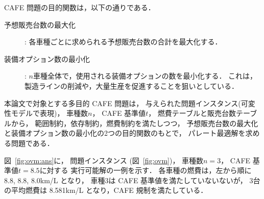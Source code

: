 CAFE 問題の目的関数は，以下の通りである．
\begin{description}
 \item[予想販売台数の最大化]: 各車種ごとに求められる予想販売台数の合計を最大化する．
 \item[装備オプション数の最小化]: $n$車種全体で，使用される装備オプションの数を最小化する．
   これは，製造ラインの削減や，大量生産を促進することを狙いとしている．
\end{description}

本論文で対象とする多目的 CAFE 問題は，
与えられた問題インスタンス(可変性モデルで表現)，
車種数$n$，
CAFE 基準値$t$，
燃費テーブルと販売台数テーブルから，
範囲制約，依存制約，燃費制約を満たしつつ，
予想販売台数の最大化と装備オプション数の最小化の2つの目的関数のもとで，
パレート最適解を求める問題である．

図~\ref{fig:ovm:ans}に，
問題インスタンス (図~\ref{fig:ovm})，
車種数$n=3$，
CAFE 基準値$t=8.5$に対する
実行可能解の一例を示す．
各車種の燃費は，左から順に 8.8, 8.8, 8.0km/L となり，
車種3は CAFE 基準値を満たしていないないが，
3台の平均燃費は 8.581km/L となり，CAFE 規制を満たしている．

